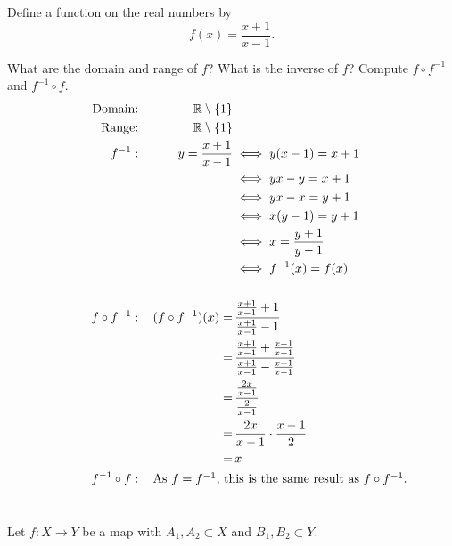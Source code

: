 \section{}\label{sec:1-23}

Define a function on the real numbers by
\[f(x) = \frac{x + 1}{x - 1}.\]

What are the domain and range of $f$? What is the inverse of $f$? Compute $f \circ f^{-1}$ and $f^{-1} \circ f$.
\hr
\begin{alignat*}{5}
    \text{Domain:}  && \mathbb{R} \setminus \{1\} \\
    \text{Range:}  && \mathbb{R} \setminus \{1\} \\
    f^{-1}: &&\,y = \frac{x+1}{x-1} &\iff y(x-1) = x+1 \\
            &&&\iff yx-y = x+1 \\
            &&&\iff yx-x = y+1 \\
            &&&\iff x(y-1) = y+1 \\
            &&&\iff x = \frac{y+1}{y-1} \\
            &&&\iff f^{-1}(x) = f(x) \\
    \\
    f \circ f^{-1}: &&\,(f \circ f^{-1})(x) = &\,\frac{\frac{x+1}{x-1}+1}{\frac{x+1}{x-1}-1} \\
                    &&= &\,\frac{\frac{x+1}{x-1}+\frac{x-1}{x-1}}{\frac{x+1}{x-1}-\frac{x-1}{x-1}} \\
                    &&= &\,\frac{\frac{2x}{x-1}}{\frac{2}{x-1}} \\
                    &&= &\,\frac{2x}{x-1} \cdot \frac{x-1}{2} \\
                    &&= &\,x \\
    f^{-1} \circ f: &&\omit\,\rlap{As $f = f^{-1}$, this is the same result as $f \circ f^{-1}$.}
\end{alignat*}

\section{}\label{sec:1-24}

Let $f:X \rightarrow Y$ be a map with $A_1, A_2 \subset X$ and $B_1, B_2 \subset Y$.

